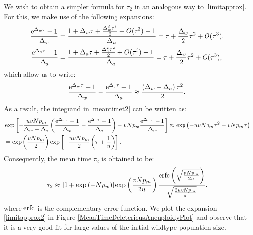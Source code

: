 \documentclass[12pt]{extarticle}
\newcommand{\e}{{\rm e}}
\newcommand{\erfc}{{\rm erfc}}
\begin{document}
We wish to obtain a simpler formula for $\tau_2$ in an analogous way to \eqref{limitapprox}. For this, we make use of the following expansions:
\begin{align*}
\frac{\e^{\Delta_w\tau}-1}{\Delta_w}&=\frac{1+\Delta_w\tau+\frac{\Delta_w^2\tau^2}{2}+O(\tau^3)-1}{\Delta_w}=\tau+\frac{\Delta_w}{2}\tau^2+O(\tau^3).\\
\frac{\e^{\Delta_a\tau}-1}{\Delta_a}&=\frac{1+\Delta_a\tau+\frac{\Delta_a^2\tau^2}{2}+O(\tau^3)-1}{\Delta_a}=\tau+\frac{\Delta_w}{2}\tau^2+O(\tau^3),
\end{align*}
which allow us to write:
\begin{equation*}
\frac{\e^{\Delta_w\tau}-1}{\Delta_w}-\frac{\e^{\Delta_a\tau}-1}{\Delta_a}\approx\frac{\left(\Delta_w-\Delta_a\right)\tau^2}{2}.
\end{equation*}
As a result, the integrand in \eqref{meantimet2} can be written as:
\begin{align*}
&\exp\left[-\frac{uvNp_m}{\Delta_w-\Delta_a}\left(\frac{\e^{\Delta_w\tau}-1}{\Delta_w}-\frac{\e^{\Delta_a\tau}-1}{\Delta_a}\right)-vNp_m\frac{\e^{\Delta_w\tau}-1}{\Delta_w}\right]\approx\exp\left(-uvNp_m\tau^2-vNp_m\tau\right)\\
&=\exp\left(\frac{vNp_m}{2}\right)\exp\left[-\frac{uvNp_m}{2}\left(\tau+\frac{1}{u}\right)\right].
\end{align*}
Consequently, the mean time $\tau_2$ is obtained to be:
\begin{align}\label{limitapprox2}
\tau_2\approx\left[1+\exp\left(-Np_w\right)\right]\exp\left(\frac{vNp_m}{2u}\right)\frac{\erfc\left(\sqrt{\frac{vNp_m}{2u}}\right)}{\sqrt{\frac{2uvNp_m}{\pi}}},
\end{align}
where $\erfc$ is the complementary error function. We plot the expansion \eqref{limitapprox2} in Figure \ref{MeanTimeDeleteriousAneuploidyPlot} and observe that it is a very good fit for large values of the initial wildtype population size.
\end{document}
